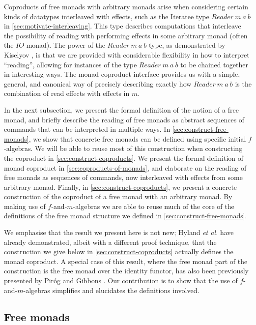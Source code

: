 \documentclass{jfp1}
\begin{document}
Coproducts of free monads with arbitrary monads arise when considering
certain kinds of datatypes interleaved with effects, such as the
Iteratee type $\mathit{Reader}~m~a~b$ in
\autoref{sec:motivate-interleaving}. This type describes computations
that interleave the possibility of reading with performing effects in
some arbitrary monad (often the $\mathit{IO}$ monad). The power of the
$\mathit{Reader}~m~a~b$ type, as demonstrated by Kiselyov
\cite{kiselyov12iteratees}, is that we are provided with considerable
flexibility in how to interpret ``reading'', allowing for instances of
the type $\mathit{Reader}~m~a~b$ to be chained together in interesting
ways. The monad coproduct interface provides us with a simple,
general, and canonical way of precisely describing exactly how
$\mathit{Reader}~m~a~b$ is the combination of read effects with
effects in $m$.

In the next subsection, we present the formal definition of the notion of a free
monad, and briefly describe the reading of free monads as abstract
sequences of commands that can be interpreted in multiple ways. In
\autoref{sec:construct-free-monads}, we show that concrete free monads
can be defined using specific initial $f$-algebras. We will be able to reuse
most of this construction when constructing the coproduct in
\autoref{sec:construct-coproducts}. We present the formal definition of
monad coproduct in \autoref{sec:coproducts-of-monads}, and elaborate
on the reading of free monads as sequences of commands, now
interleaved with effects from some arbitrary monad. Finally, in
\autoref{sec:construct-coproducts}, we present a concrete construction
of the coproduct of a free monad with an arbitrary monad. By making
use of $f$-and-$m$-algebras we are able to reuse much of the core of
the definitions of the free monad structure we defined in
\autoref{sec:construct-free-monads}.

We emphasise that the result we present here is not new; Hyland
\emph{et al.} have already demonstrated, albeit with a different proof
technique, that the construction we give below in
\autoref{sec:construct-coproducts} actually defines the monad
coproduct. A special case of this result, where the free monad part of
the construction is the free monad over the identity functor, has also
been previously presented by Pir{\'o}g and Gibbons
\cite{pirog12tracing}. Our contribution is to show that the use of
$f$-and-$m$-algebras simplifies and elucidates the definitions
involved.

\subsection{Free monads}
\label{sec:free-monads}
\end{document}
